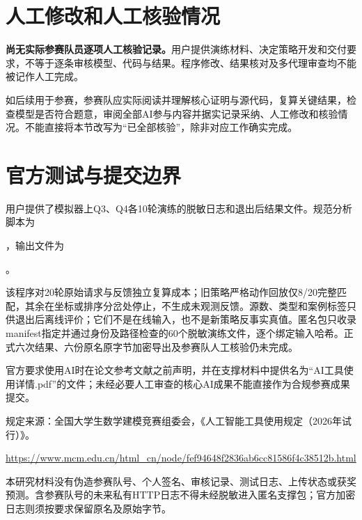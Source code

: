 \documentclass[UTF8,fontset=fandol,a4paper,zihao=-4]{ctexart}
\begin{document}
\section{人工修改和人工核验情况}
\textbf{尚无实际参赛队员逐项人工核验记录。}用户提供演练材料、决定策略开发和交付要求，不等于逐条审核模型、代码与结果。程序修改、结果核对及多代理审查均不能被记作人工完成。

如后续用于参赛，参赛队应实际阅读并理解核心证明与源代码，复算关键结果，检查模型是否符合题意，审阅全部AI参与内容并据实记录采纳、人工修改和核验情况。不能直接将本节改写为“已全部核验”，除非对应工作确实完成。

\section{官方测试与提交边界}
用户提供了模拟器上Q3、Q4各10轮演练的脱敏日志和退出后结果文件。规范分析脚本为\par
\noindent{}，输出文件为\par
\noindent{}。

该程序对20轮原始请求与反馈独立复算成本；旧策略严格动作回放仅8/20完整匹配，其余在坐标或排序分岔处停止，不生成未观测反馈。源数、类型和案例标签只供退出后离线评价；它们不是在线输入，也不是新策略反事实真值。匿名包只收录manifest指定并通过身份及路径检查的60个脱敏演练文件，逐个绑定输入哈希。正式六次结果、六份原名原字节加密导出及参赛队人工核验仍未完成。

官方要求使用AI时在论文参考文献之前声明，并在支撑材料中提供名为“AI工具使用详情.pdf”的文件；未经必要人工审查的核心AI成果不能直接作为合规参赛成果提交。

规定来源：全国大学生数学建模竞赛组委会，《人工智能工具使用规定（2026年试行）》。
\begin{flushleft}\small
\url{https://www.mcm.edu.cn/html_cn/node/fef94648f2836ab6cc81586f4c38512b.html}
\end{flushleft}

本研究材料没有伪造参赛队号、个人签名、审核记录、测试日志、上传状态或获奖预测。含参赛队号的未来私有HTTP日志不得未经脱敏进入匿名支撑包；官方加密日志则须按要求保留原名及原始字节。
\end{document}
